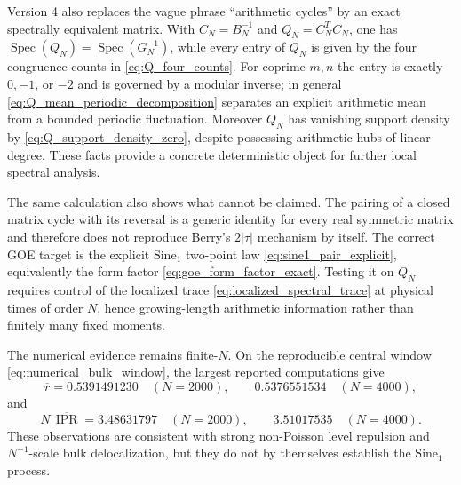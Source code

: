 \documentclass[11pt]{amsart}
\numberwithin{equation}{section}
\theoremstyle{plain}
\theoremstyle{definition}
\theoremstyle{remark}
\newcommand{\IPR}{\operatorname{IPR}}
\newcommand{\Spec}{\operatorname{Spec}}
\begin{document}
Version 4 also replaces the vague phrase ``arithmetic cycles'' by an exact spectrally equivalent matrix.  With $C_N=B_N^{-1}$ and $Q_N=C_N^TC_N$, one has $\Spec(Q_N)=\Spec(G_N^{-1})$, while every entry of $Q_N$ is given by the four congruence counts in \eqref{eq:Q_four_counts}.  For coprime $m,n$ the entry is exactly $0,-1$, or $-2$ and is governed by a modular inverse; in general \eqref{eq:Q_mean_periodic_decomposition} separates an explicit arithmetic mean from a bounded periodic fluctuation.  Moreover $Q_N$ has vanishing support density by \eqref{eq:Q_support_density_zero}, despite possessing arithmetic hubs of linear degree.  These facts provide a concrete deterministic object for further local spectral analysis.

The same calculation also shows what cannot be claimed.  The pairing of a closed matrix cycle with its reversal is a generic identity for every real symmetric matrix and therefore does not reproduce Berry's $2|\tau|$ mechanism by itself.  The correct GOE target is the explicit $\mathrm{Sine}_1$ two-point law \eqref{eq:sine1_pair_explicit}, equivalently the form factor \eqref{eq:goe_form_factor_exact}.  Testing it on $Q_N$ requires control of the localized trace \eqref{eq:localized_spectral_trace} at physical times of order $N$, hence growing-length arithmetic information rather than finitely many fixed moments.

The numerical evidence remains finite-$N$.  On the reproducible central window \eqref{eq:numerical_bulk_window}, the largest reported computations give
\begin{equation}
\overline r
=0.5391491230\quad(N=2000),
\qquad
0.5376551534\quad(N=4000),
\end{equation}
and
\begin{equation}
N\,\overline{\IPR}
=3.48631797\quad(N=2000),
\qquad
3.51017535\quad(N=4000).
\end{equation}
These observations are consistent with strong non-Poisson level repulsion and $N^{-1}$-scale bulk delocalization, but they do not by themselves establish the $\mathrm{Sine}_1$ process.
\end{document}
